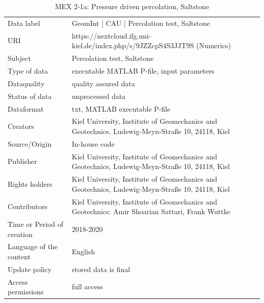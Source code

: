 \begin{table}[!ht]
\caption{MEX 2-1a: Pressure driven percolation, Saltstone}
\label{tab:dms-mex2-1a}
\small
\begin{tabular}{R{3cm}|L{7cm}}
\hline
%
Data label & GeomInt | CAU | Percolation test, Saltstone\\
URI &  https://nextcloud.ifg.uni-kiel.de/index.php/s/9JZZcpS4S3JJT9S (Numerics)
\\
Subject  &  Percolation test, Saltstone\\
Type of data  & executable MATLAB P-file, input parameters\\
Dataquality  &  quality assured data \\
Status of data  &  unprocessed data\\
Dataformat  & txt, MATLAB executable P-file\\
Creators  &  Kiel University, Institute of Geomechanics and Geotechnics, Ludewig-Meyn-Stra\ss e 10, 24118, Kiel\\
Source/Origin & In-house code \\
Publisher  &  Kiel University, Institute of Geomechanics and Geotechnics, Ludewig-Meyn-Stra\ss e 10, 24118, Kiel \\
Rights holders &  Kiel University, Institute of Geomechanics and Geotechnics, Ludewig-Meyn-Stra\ss e 10, 24118, Kiel \\
Contributors &   Kiel University, Institute of Geomechanics and Geotechnics: Amir Shoarian Sattari, Frank Wuttke\\
Time or Period of creation &  2018-2020\\
Language of the content &  English\\
Update policy &  stored data is final\\
Access permissions & full access\\
%
\hline
\end{tabular}
\end{table}